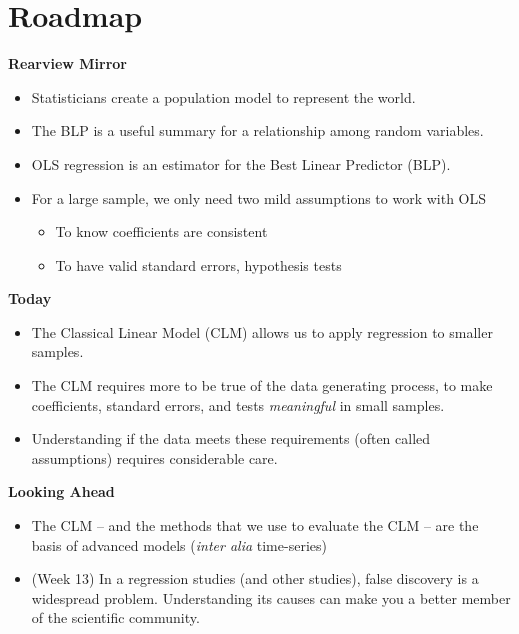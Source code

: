 \documentclass[
]{book}
\providecommand{\tightlist}{%
  \setlength{\itemsep}{0pt}\setlength{\parskip}{0pt}}
\theoremstyle{definition}
\theoremstyle{definition}
\theoremstyle{definition}
\theoremstyle{definition}
\theoremstyle{remark}
\begin{document}
\hypertarget{roadmap-8}{%
\section{Roadmap}\label{roadmap-8}}

\textbf{Rearview Mirror}

\begin{itemize}
\tightlist
\item
  Statisticians create a population model to represent the world.
\item
  The BLP is a useful summary for a relationship among random variables.
\item
  OLS regression is an estimator for the Best Linear Predictor (BLP).
\item
  For a large sample, we only need two mild assumptions to work with OLS

  \begin{itemize}
  \tightlist
  \item
    To know coefficients are consistent
  \item
    To have valid standard errors, hypothesis tests
  \end{itemize}
\end{itemize}

\textbf{Today}

\begin{itemize}
\tightlist
\item
  The Classical Linear Model (CLM) allows us to apply regression to smaller samples.
\item
  The CLM requires more to be true of the data generating process, to make coefficients, standard errors, and tests \emph{meaningful} in small samples.
\item
  Understanding if the data meets these requirements (often called assumptions) requires considerable care.
\end{itemize}

\textbf{Looking Ahead}

\begin{itemize}
\tightlist
\item
  The CLM -- and the methods that we use to evaluate the CLM -- are the basis of advanced models (\emph{inter alia} time-series)
\item
  (Week 13) In a regression studies (and other studies), false discovery is a widespread problem. Understanding its causes can make you a better member of the scientific community.
\end{itemize}
\end{document}

